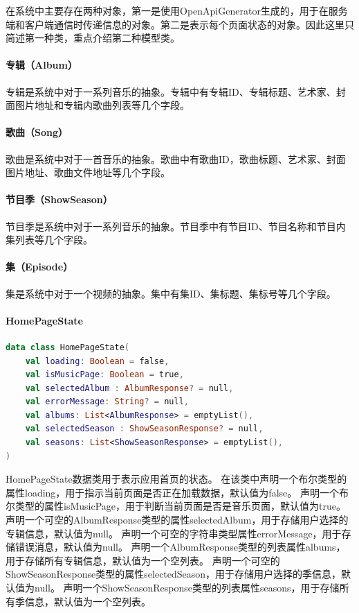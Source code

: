 \documentclass[main.tex]{subfiles}
\begin{document}
在系统中主要存在两种对象，第一是使用OpenApiGenerator生成的，用于在服务端和客户端通信时传递信息的对象。第二是表示每个页面状态的对象。因此这里只简述第一种类，重点介绍第二种模型类。

\paragraph{专辑（Album）} 专辑是系统中对于一系列音乐的抽象。专辑中有专辑ID、专辑标题、艺术家、封面图片地址和专辑内歌曲列表等几个字段。

\paragraph{歌曲（Song）} 歌曲是系统中对于一首音乐的抽象。歌曲中有歌曲ID，歌曲标题、艺术家、封面图片地址、歌曲文件地址等几个字段。

\paragraph{节目季（ShowSeason）} 节目季是系统中对于一系列音乐的抽象。节目季中有节目ID、节目名称和节目内集列表等几个字段。

\paragraph{集（Episode）} 集是系统中对于一个视频的抽象。集中有集ID、集标题、集标号等几个字段。


\paragraph{HomePageState}

\begin{lstlisting}[language=Kotlin]
data class HomePageState(
    val loading: Boolean = false,
    val isMusicPage: Boolean = true,
    val selectedAlbum : AlbumResponse? = null,
    val errorMessage: String? = null,
    val albums: List<AlbumResponse> = emptyList(),
    val selectedSeason : ShowSeasonResponse? = null,
    val seasons: List<ShowSeasonResponse> = emptyList(),
)
\end{lstlisting}

HomePageState数据类用于表示应用首页的状态。
在该类中声明一个布尔类型的属性loading，用于指示当前页面是否正在加载数据，默认值为false。
声明一个布尔类型的属性isMusicPage，用于判断当前页面是否是音乐页面，默认值为true。
声明一个可空的AlbumResponse类型的属性selectedAlbum，用于存储用户选择的专辑信息，默认值为null。
声明一个可空的字符串类型属性errorMessage，用于存储错误消息，默认值为null。
声明一个AlbumResponse类型的列表属性albums，用于存储所有专辑信息，默认值为一个空列表。
声明一个可空的ShowSeasonResponse类型的属性selectedSeason，用于存储用户选择的季信息，默认值为null。
声明一个ShowSeasonResponse类型的列表属性seasons，用于存储所有季信息，默认值为一个空列表。
\end{document}
